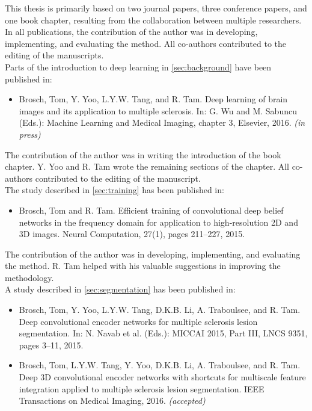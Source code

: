 
This thesis is primarily based on two journal papers, three conference
papers, and one book chapter, resulting from the collaboration between multiple
researchers. In all publications, the contribution of the author was in
developing, implementing, and evaluating the method. All co-authors
contributed to the editing of the manuscripts.
\\[1em]
Parts of the introduction to deep learning in \ref{sec:background} have been
published in:
\begin{itemize}
\item Brosch, Tom, Y. Yoo, L.Y.W. Tang, and R. Tam.
Deep learning of brain images and its application to multiple sclerosis.
In: G. Wu and M. Sabuncu (Eds.): Machine Learning and Medical Imaging, chapter 3,
Elsevier, 2016. \emph{(in press)}
\end{itemize}
The contribution of the author was in writing the introduction of the book
chapter. Y. Yoo and R. Tam wrote the remaining sections of the chapter. All
co-authors contributed to the editing of the manuscript.
\\[1em]
The study described in \ref{sec:training} has been published in:
\begin{itemize}
\item Brosch, Tom and R. Tam. Efficient training of convolutional deep
belief networks in the frequency domain for application to high-resolution 2D
and 3D images. Neural Computation, 27(1), pages 211--227, 2015.
\end{itemize}
The contribution of the author was in developing, implementing, and evaluating
the method. R. Tam helped with his valuable suggestions in improving the
methodology.
\\[1em]
A study described in \ref{sec:segmentation} has been published in:
\begin{itemize}
\item Brosch, Tom, Y. Yoo, L.Y.W. Tang, D.K.B. Li, A. Traboulsee, and R. Tam.
Deep convolutional encoder networks for multiple sclerosis lesion segmentation.
In: N. Navab et al. (Eds.): MICCAI 2015, Part III, LNCS 9351, pages 3--11, 2015.
\item Brosch, Tom, L.Y.W. Tang, Y. Yoo, D.K.B. Li, A. Traboulsee, and R. Tam.
Deep 3D convolutional encoder networks with shortcuts for multiscale feature
integration applied to multiple sclerosis lesion segmentation. IEEE Transactions
on Medical Imaging, 2016. \emph{(accepted)}
\end{itemize}
